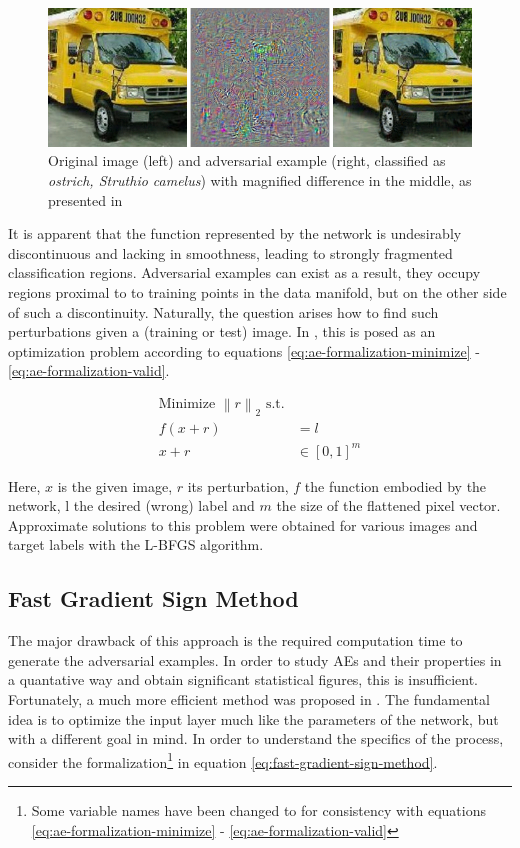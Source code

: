 \documentclass[11pt, a4paper]{article}
\newcommand\brackets[1]{\left[#1\right]}
\renewcommand{\vec}[1]{\underline{#1}}
\newcommand{\mat}[1]{\underline{\underline{#1}}}
\newcommand{\norm}[1]{\left\lVert#1\right\rVert}
\begin{document}
\begin{figure}[htp]
\centering
	\includegraphics[width=\textwidth]{images/intruiging_properties_ae.png}
	\caption{Original image (left) and adversarial example (right, classified as \emph{ostrich, Struthio
camelus}) with magnified difference in the middle, as presented in \cite{intriguing-properties-of-neural-networks}}
	\label{fig:intriguing-properties-ae}
\end{figure}

It is apparent that the function represented by the network is undesirably discontinuous and lacking in smoothness, leading to strongly fragmented classification regions. Adversarial examples can exist as a result, they occupy regions proximal to to training points in the data manifold, but on the other side of such a discontinuity. Naturally, the question arises how to find such perturbations given a (training or test) image. In \cite{intriguing-properties-of-neural-networks}, this is posed as an optimization problem according to equations \eqref{eq:ae-formalization-minimize} - \eqref{eq:ae-formalization-valid}.

\begin{align}
	\text{Minimize $\norm{r}_2$ s.t.} \label{eq:ae-formalization-minimize} \\
	f(x + r) &= l \label{eq:ae-formalization-label} \\
	x + r &\in \brackets{0, 1}^m \label{eq:ae-formalization-valid}
\end{align}

Here, $x$ is the given image, $r$ its perturbation, $f$ the function embodied by the network, l the desired (wrong) label and $m$ the size of the flattened pixel vector. Approximate solutions to this problem were obtained for various images and target labels with the L-BFGS algorithm.

\subsection{Fast Gradient Sign Method}
The major drawback of this approach is the required computation time to generate the adversarial examples. In order to study AEs and their properties in a quantative way and obtain significant statistical figures, this is insufficient. Fortunately, a much more efficient method was proposed in \cite{explaining-and-harnessing-adversarial-examples}. The fundamental idea is to optimize the input layer much like the parameters of the network, but with a different goal in mind. In order to understand the specifics of the process, consider the formalization\footnote{Some variable names have been changed to for consistency with equations \eqref{eq:ae-formalization-minimize} - \eqref{eq:ae-formalization-valid}} in equation \eqref{eq:fast-gradient-sign-method}.
\end{document}
